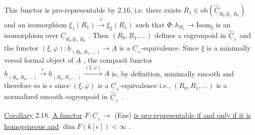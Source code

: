 \begin{center}
\end{center}
This functor is pro-representable by 2.16, i.e. there exists  $R_{1} \in \mathrm{ob}(\hat{\underline{C}}_{R_{0} \hat{\otimes}_{\wedge} R_{0}})$  and an isomorphism  $\xi_{1}(R_{1}) \xrightarrow{\ \varphi\ } \xi_{2}(R_{1})$  such that  $\Phi : h_{R_{1}} \to \mathrm{Isom}_{\xi}$  is an isomorphism over  $\underline{C}_{R_{0} \hat{\otimes}_{\wedge} R_{0}}$  . Then  $(R_{0},R_{1},\ldots)$  defines a cogroupoid in  $\hat{\underline{C}}_{\wedge}$  and the functor $(\xi,\varphi) : \underline{h}_{(R_{0},R_{1},\ldots)} \to \underline{A}$  is a  $\underline{C}_{\wedge}$-equivalence. Since  $\xi$  is a minimally versal formal object of  $\underline{A}$  , the composit functor  $\underline{h}_{(R_{0},R_{0},\ldots)} \xrightarrow{\ \epsilon\ } \underline{h}_{(R_{0},R_{1},\ldots)} \xrightarrow{\ (\xi,\varphi)\ } \underline{A}$ is, by definition, minimally smooth and therefore so is  $\epsilon$  since  $(\xi,\varphi)$  is a $\underline{C}_{\wedge}$-equivalence i.e.,  $(R_{0},R_{1},\ldots)$  is a normalized smooth cogroupoid in  $\hat{\underline{C}}_{\wedge}$  .



\underline{Corollary} 2.18.  \underline{A functor}  $F : \underline{C}_\wedge \longrightarrow$ (Ens)  \underline{is pro-representable if and only if it is homogeneous and}  $\dim F(k[\epsilon]) < \infty$  .

